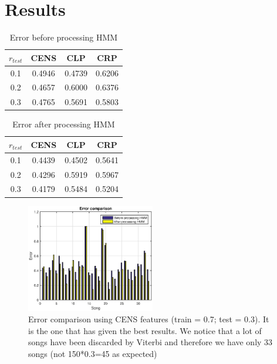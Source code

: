 \section{Results}
\label{sec:results}


\begin{table}[h!]
	\caption{Error before processing HMM}
	\centering
	\begin{tabular}{|c |c c c|}
	\hline
	$r_{test}$ & CENS & CLP & CRP\\ \hline
	0.1 & 0.4946 & 0.4739 & 0.6206\\
	0.2 & 0.4657 & 0.6000 & 0.6376\\
	0.3 & 0.4765 & 0.5691 & 0.5803\\
	\hline
	\end{tabular}
\end{table}

\begin{table}[h!]
	\caption{Error after processing HMM}
	\centering
	\begin{tabular}{|c |c c c|}
	\hline
	$r_{test}$ & CENS & CLP & CRP\\ \hline
	0.1 & 0.4439 & 0.4502 & 0.5641\\
	0.2 & 0.4296 & 0.5919 & 0.5967\\
	0.3 & 0.4179 & 0.5484 & 0.5204\\
	\hline
	\end{tabular}
\end{table}

\begin{figure} [h!]
	\includegraphics[width=0.5\textwidth]{img/Result_HMM/CENS/plot03071}
	\caption{Error comparison using CENS features (train = 0.7; test = 0.3). It is the one that has given the best results. We notice that a lot of songs have been discarded by Viterbi and therefore we have only 33 songs (not 150*0.3=45 as expected)}
\end{figure}

